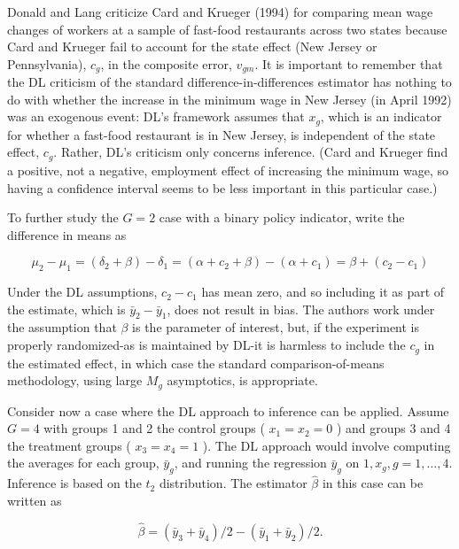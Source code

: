 \documentclass[10pt]{article}
\begin{document}
Donald and Lang criticize Card and Krueger (1994) for comparing mean wage changes of workers at a sample of fast-food restaurants across two states because Card and Krueger fail to account for the state effect (New Jersey or Pennsylvania), $c_{g}$, in the composite error, $v_{g m}$. It is important to remember that the DL criticism of the standard difference-in-differences estimator has nothing to do with whether the increase in the minimum wage in New Jersey (in April 1992) was an exogenous event: DL's framework assumes that $x_{g}$, which is an indicator for whether a fast-food restaurant is in New Jersey, is independent of the state effect, $c_{g}$. Rather, DL's criticism only concerns inference. (Card and Krueger find a positive, not a negative, employment effect of increasing the minimum wage, so having a confidence interval seems to be less important in this particular case.)

To further study the $G=2$ case with a binary policy indicator, write the difference in means as


\begin{equation*}
\mu_{2}-\mu_{1}=\left(\delta_{2}+\beta\right)-\delta_{1}=\left(\alpha+c_{2}+\beta\right)-\left(\alpha+c_{1}\right)=\beta+\left(c_{2}-c_{1}\right) \tag{20.69}
\end{equation*}


Under the DL assumptions, $c_{2}-c_{1}$ has mean zero, and so including it as part of the estimate, which is $\bar{y}_{2}-\bar{y}_{1}$, does not result in bias. The authors work under the assumption that $\beta$ is the parameter of interest, but, if the experiment is properly randomized-as is maintained by DL-it is harmless to include the $c_{g}$ in the estimated effect, in which case the standard comparison-of-means methodology, using large $M_{g}$ asymptotics, is appropriate.

Consider now a case where the DL approach to inference can be applied. Assume $G=4$ with groups 1 and 2 the control groups ( $x_{1}=x_{2}=0$ ) and groups 3 and 4 the treatment groups ( $x_{3}=x_{4}=1$ ). The DL approach would involve computing the averages for each group, $\bar{y}_{g}$, and running the regression $\bar{y}_{g}$ on $1, x_{g}, g=1, \ldots, 4$. Inference is based on the $t_{2}$ distribution. The estimator $\hat{\beta}$ in this case can be written as


\begin{equation*}
\hat{\beta}=\left(\bar{y}_{3}+\bar{y}_{4}\right) / 2-\left(\bar{y}_{1}+\bar{y}_{2}\right) / 2 . \tag{20.70}
\end{equation*}
\end{document}
